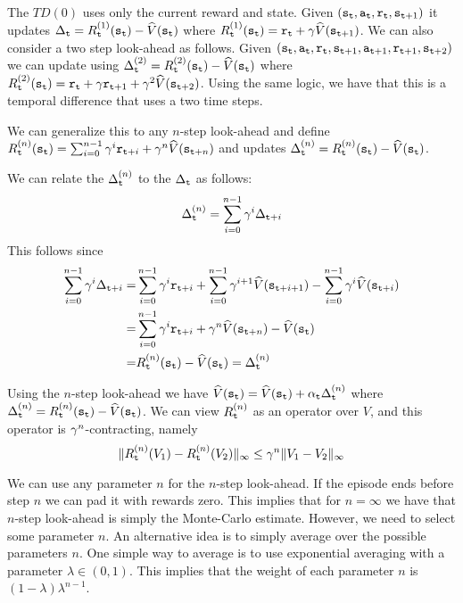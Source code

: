 The $TD(0)$ uses only the current reward and state. Given
$({\tt s}_{\tt t},{\tt a}_{\tt t},{\tt r}_{\tt t},{\tt s}_{{\tt t}+1})$ it
updates $\Delta_{\tt t}=R^{(1)}_{\tt t}({\tt s}_{\tt t}) -
\widehat{V}({\tt s}_{\tt t})$ where $R^{(1)}_{\tt t}({\tt s}_{\tt t})=
{\tt r}_{\tt t} +\gamma \widehat{V}({\tt s}_{{\tt t}+1})$. We can
also consider a two step look-ahead as follows. Given
$({\tt s}_{\tt t},{\tt a}_{\tt t},{\tt r}_{\tt t},{\tt s}_{{\tt t}+1},{\tt a}_{{\tt t}+1},{\tt r}_{{\tt t}+1},{\tt s}_{{\tt t}+2})$
we can update using
$\Delta^{(2)}_{\tt t}=R^{(2)}_{\tt t}({\tt s}_{\tt t}) -
\widehat{V}({\tt s}_{\tt t})$ where $R^{(2)}_{\tt t}({\tt s}_{\tt t})=
{\tt r}_{\tt t}+\gamma {\tt r}_{{\tt t}+1} +\gamma^2
\widehat{V}({\tt s}_{{\tt t}+2})$. Using the same logic, we have that
this is a temporal difference that uses a two time steps.

We can generalize this to any $n$-step look-ahead and define
$R^{(n)}_{\tt t}({\tt s}_{\tt t})= \sum_{i=0}^{n-1} \gamma^i
{\tt r}_{{\tt t}+i}+\gamma^n \widehat{V}({\tt s}_{{\tt t}+n})$ and
updates $\Delta^{(n)}_{\tt t}=R^{(n)}_{\tt t}({\tt s}_{\tt t}) -
\widehat{V}({\tt s}_{\tt t})$.

We can relate the $\Delta^{(n)}_{\tt t}$ to the $\Delta_{\tt t}$ as
follows:
\[
\Delta^{(n)}_{\tt t}=\sum_{i=0}^{n-1} \gamma^i \Delta_{{\tt t}+i}
\]
This follows since
\begin{align*}
\sum_{i=0}^{n-1} \gamma^i \Delta_{{\tt t}+i}
=&\sum_{i=0}^{n-1}
\gamma^i {\tt r}_{{\tt t}+i}+ \sum_{i=0}^{n-1} \gamma^{i+1}
\widehat{V}({\tt s}_{{\tt t}+i+1})- \sum_{i=0}^{n-1} \gamma^{i}
\widehat{V}({\tt s}_{{\tt t}+i})\\
=&\sum_{i=0}^{n-1} \gamma^i
{\tt r}_{{\tt t}+i}+\gamma^n
\widehat{V}({\tt s}_{{\tt t}+n})-\widehat{V}({\tt s}_{\tt t})\\
=&R^{(n)}_{\tt t}({\tt s}_{\tt t})-\widehat{V}({\tt s}_{\tt t})=\Delta^{(n)}_{\tt t}
\end{align*}


Using the $n$-step look-ahead we have
$\widehat{V}({\tt s}_{\tt t})=\widehat{V}({\tt s}_{\tt t})+\alpha_{\tt t}
\Delta^{(n)}_{\tt t}$ where
$\Delta^{(n)}_{\tt t}=R^{(n)}_{\tt t}({\tt s}_{\tt t})-\widehat{V}({\tt s}_{\tt t})$.
We can view $R^{(n)}_{\tt t}$ as an operator over $V$, and this operator is
$\gamma^n$-contracting, namely
\[
\| R^{(n)}_{\tt t}(V_1)-R^{(n)}_{\tt t}(V_2)\|_\infty \leq \gamma^n
\|V_1-V_2\|_\infty
\]

We can use any parameter $n$ for the $n$-step look-ahead. If the
episode ends before step $n$ we can pad it with rewards zero. This
implies that for $n=\infty$ we have that $n$-step look-ahead is
simply the Monte-Carlo estimate. However, we need to select some
parameter $n$. An alternative idea is to simply average over the
possible parameters $n$. One simple way to average is to use
exponential averaging with a parameter $\lambda\in(0,1)$. This
implies that the weight of each parameter $n$ is
$(1-\lambda)\lambda^{n-1}$.

